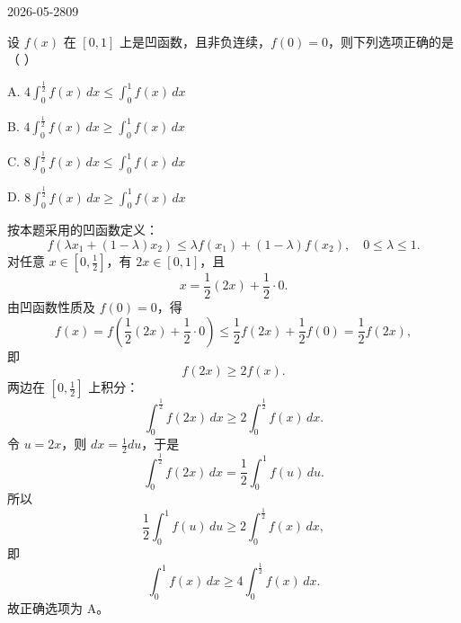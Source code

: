 \begin{mistake}{2026-05-28}{09}

\begin{problemcontent}
设 \(f(x)\) 在 \([0,1]\) 上是凹函数，且非负连续，\(f(0)=0\)，则下列选项正确的是（ ）

A. \(4\int_0^{\frac12} f(x)\,dx \le \int_0^1 f(x)\,dx\)

B. \(4\int_0^{\frac12} f(x)\,dx \ge \int_0^1 f(x)\,dx\)

C. \(8\int_0^{\frac12} f(x)\,dx \le \int_0^1 f(x)\,dx\)

D. \(8\int_0^{\frac12} f(x)\,dx \ge \int_0^1 f(x)\,dx\)
\end{problemcontent}

\begin{solutioncontent}
按本题采用的凹函数定义：
\[
f(\lambda x_1+(1-\lambda)x_2)\le \lambda f(x_1)+(1-\lambda)f(x_2),\quad 0\le \lambda\le 1.
\]
对任意 \(x\in[0,\frac12]\)，有 \(2x\in[0,1]\)，且
\[
x=\frac12(2x)+\frac12\cdot0.
\]
由凹函数性质及 \(f(0)=0\)，得
\[
f(x)=f\left(\frac12(2x)+\frac12\cdot0\right)
\le \frac12 f(2x)+\frac12 f(0)
=\frac12 f(2x),
\]
即
\[
f(2x)\ge 2f(x).
\]
两边在 \([0,\frac12]\) 上积分：
\[
\int_0^{\frac12} f(2x)\,dx
\ge 2\int_0^{\frac12} f(x)\,dx.
\]
令 \(u=2x\)，则 \(dx=\frac12du\)，于是
\[
\int_0^{\frac12}f(2x)\,dx
=\frac12\int_0^1 f(u)\,du.
\]
所以
\[
\frac12\int_0^1 f(u)\,du
\ge 2\int_0^{\frac12}f(x)\,dx,
\]
即
\[
\int_0^1 f(x)\,dx
\ge 4\int_0^{\frac12}f(x)\,dx.
\]
故正确选项为 \(\mathrm{A}\)。
\end{solutioncontent}


\end{mistake}
